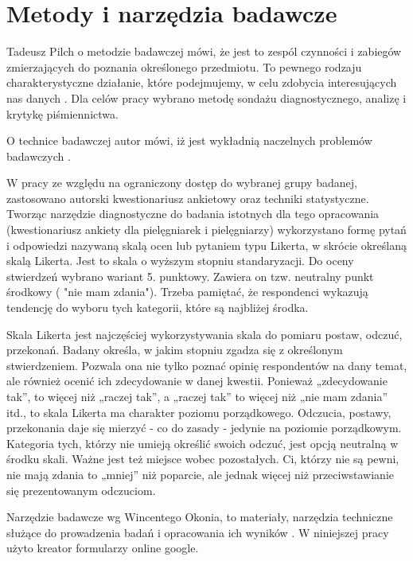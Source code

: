 \documentclass[a4paper,12pt,twoside,openright]{mwrep}
\begin{document}
\section{Metody i narzędzia badawcze}
Tadeusz Pilch o metodzie badawczej mówi, że jest to zespól czynności i zabiegów zmierzających do poznania określonego przedmiotu. To pewnego rodzaju charakterystyczne działanie, które podejmujemy, w celu zdobycia interesujących nas danych \cite{tadeusz}. Dla celów pracy wybrano metodę sondażu diagnostycznego, analizę i krytykę piśmiennictwa.\cite{krys}

O technice badawczej autor mówi, iż jest wykładnią naczelnych problemów badawczych \cite{tadeusz}. 

W pracy ze względu na ograniczony dostęp do wybranej grupy badanej, zastosowano autorski kwestionariusz ankietowy oraz techniki statystyczne.
Tworząc narzędzie diagnostyczne do badania istotnych dla tego opracowania (kwestionariusz ankiety dla pielęgniarek i pielęgniarzy) wykorzystano formę pytań i odpowiedzi nazywaną skalą ocen lub pytaniem typu Likerta, w skrócie określaną skalą Likerta. Jest to skala o wyższym stopniu standaryzacji. Do oceny stwierdzeń wybrano wariant 5. punktowy. Zawiera on tzw. neutralny punkt środkowy ( "nie mam zdania"). Trzeba pamiętać, że respondenci wykazują tendencję do wyboru tych kategorii, które są najbliżej środka.

Skala Likerta jest najczęściej wykorzystywania skala do pomiaru postaw, odczuć, przekonań. Badany określa, w jakim stopniu zgadza się z określonym stwierdzeniem. Pozwala ona nie tylko poznać opinię respondentów na dany temat, ale również ocenić ich zdecydowanie w danej kwestii. Ponieważ „zdecydowanie tak”, to więcej niż „raczej tak”, a „raczej tak” to więcej niż „nie mam zdania” itd., to skala Likerta ma charakter poziomu porządkowego. Odczucia, postawy, przekonania daje się mierzyć - co do zasady - jedynie na poziomie porządkowym. Kategoria tych, którzy nie umieją określić swoich odczuć, jest opcją neutralną w środku skali. Ważne jest też miejsce wobec pozostałych. Ci, którzy nie są pewni, nie mają zdania to „mniej” niż poparcie, ale jednak więcej niż przeciwstawianie się prezentowanym odczuciom.

Narzędzie badawcze wg Wincentego Okonia, to materiały, narzędzia techniczne służące do prowadzenia badań i opracowania ich wyników \cite{winc}. W niniejszej pracy użyto kreator formularzy online google.
\end{document}
